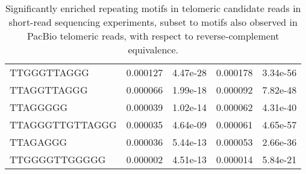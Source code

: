 \begin{samepage}
\begin{table}[h!]
\begin{tabular}{lllll}
TTGGGTTAGGG     & 0.000127              & 4.47e-28                  & 0.000178              & 3.34e-56                  \\
TTAGGTTAGGG     & 0.000066              & 1.99e-18                  & 0.000092              & 7.82e-48                  \\
TTAGGGGG        & 0.000039              & 1.02e-14                  & 0.000062              & 4.31e-40                  \\
TTAGGGTTGTTAGGG & 0.000035              & 4.64e-09                  & 0.000061              & 4.65e-57                  \\
TTAGAGGG        & 0.000036              & 5.44e-13                  & 0.000053              & 2.66e-36                  \\
TTGGGGTTGGGGG   & 0.000002              & 4.51e-13                  & 0.000014              & 5.84e-21                  \\
\hline
\end{tabular}
\caption{Significantly enriched repeating motifs in telomeric candidate reads in short-read sequencing experiments, subset to motifs also observed in PacBio telomeric reads, with respect to reverse-complement equivalence.}
\label{tab:shortread_repeatfinder}
\end{table}
\end{samepage}
